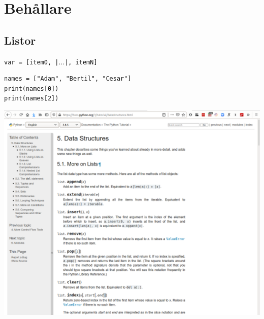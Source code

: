 \mode*

\section{Behållare}

\subsection{Listor}

\begin{frame}[fragile]
  \texttt{var = [item0, |$\dotsc$|, itemN]}
\end{frame}

\begin{frame}[fragile]
  \begin{example}
    \begin{verbatim}
names = ["Adam", "Bertil", "Cesar"]
print(names[0])
print(names[2])
    \end{verbatim}
  \end{example}
\end{frame}

\begin{frame}
  \includegraphics[width=\columnwidth]{figs/docs-lists.png}
\end{frame}

\begin{frame}[fragile]
  \begin{example}
    \inputminted{python}{examples/extend_lists.py}
  \end{example}
\end{frame}

